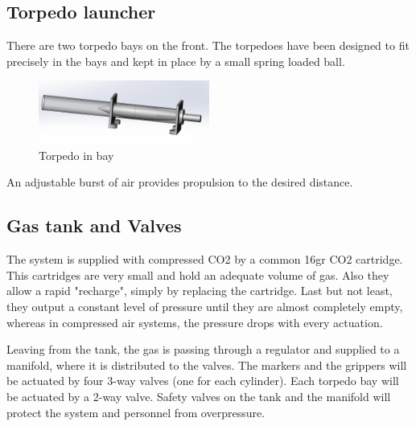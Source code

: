 \subsection{Torpedo launcher}
There are two torpedo  bays on the front. The torpedoes have been designed to fit precisely in the bays and kept in place by a small spring loaded ball.

\begin{figure}[h]
    \includegraphics[width=0.5\textwidth]{./figure/torpedo_loaded.png}
    \caption{Torpedo in bay}
    \label{fig:one_column_figure}
\end{figure}

An adjustable burst of air provides propulsion to the desired distance.

\subsection{Gas tank and Valves}
The system is supplied with compressed CO2 by a common 16gr CO2 cartridge. This cartridges are very small and hold an adequate volume of gas. Also they allow a rapid "recharge", simply by replacing the cartridge. Last but not least, they output a constant level of pressure until they are almost completely empty, whereas in compressed air systems, the pressure drops with every actuation.

Leaving from the tank, the gas is passing through a regulator and supplied to a manifold, where it is distributed to the valves. The markers and the grippers will be actuated by four 3-way valves (one for each cylinder). Each torpedo bay will be actuated by a 2-way valve. Safety valves on the tank and the manifold will protect the system and personnel from overpressure.
